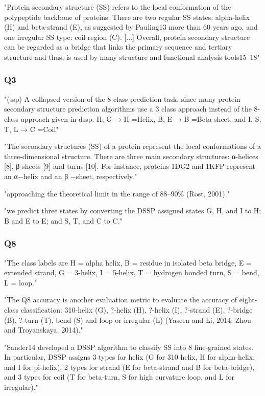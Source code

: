 \documentclass[]{scrartcl}
\begin{document}
"Protein secondary structure (SS) refers to the local conformation of the polypeptide backbone of proteins. There are two regular SS states: alpha-helix (H) and beta-strand (E), as suggested by Pauling13 more than 60 years ago, and one irregular SS type: coil region (C). [...] Overall, protein secondary structure can be regarded as a bridge that links the primary sequence and tertiary structure and thus, is used by many structure and functional analysis tools15–18" \cite{Wang2016}
\subsubsection{Q3}
"(ssp) A collapsed version of the 8 class prediction task, since many protein secondary structure prediction algorithms use a 3 class approach instead of the 8-class approach given in dssp. {H, G} → H =Helix, {B, E} → B =Beta sheet, and {I, S, T, L} → C =Coil" \cite{Lin2016}

"The secondary structures (SS) of a protein represent the local conformations of a three-dimensional structure. There are three main secondary structures: α-helices [8], β-sheets [9] and turns [10]. For instance, proteins 1DG2 and 1KFP represent an α−helix and an β −sheet, respectively." \cite{Hattori2017}

"approaching the theoretical limit in the range of 88–90\% (Rost, 2001)." \cite{Heffernan2017}

"we predict three states by converting the DSSP assigned states G, H, and I to H; B and E to E; and S, T, and C to C." \cite{Heffernan2017}
\subsubsection{Q8}
"The class labels are H = alpha helix, B = residue in isolated beta bridge, E = extended strand, G = 3-helix, I = 5-helix, T = hydrogen bonded turn, S = bend, L = loop." \cite{Lin2016}

"The Q8 accuracy is another evaluation metric to evaluate the accuracy of eight-class classification: 310-helix (G), ?-helix (H), ?-helix (I), ?-strand (E), ?-bridge (B), ?-turn (T), bend (S) and loop or irregular (L) (Yaseen and Li, 2014; Zhou and Troyanskaya, 2014)." \cite{Fang2017}

"Sander14 developed a DSSP algorithm to classify SS into 8 fine-grained states. In particular, DSSP assigns 3 types for helix (G for 310 helix, H for alpha-helix, and I for pi-helix), 2 types for strand (E for beta-strand and B for beta-bridge), and 3 types for coil (T for beta-turn, S for high curvature loop, and L for irregular)." \cite{Wang2016}
\end{document}
